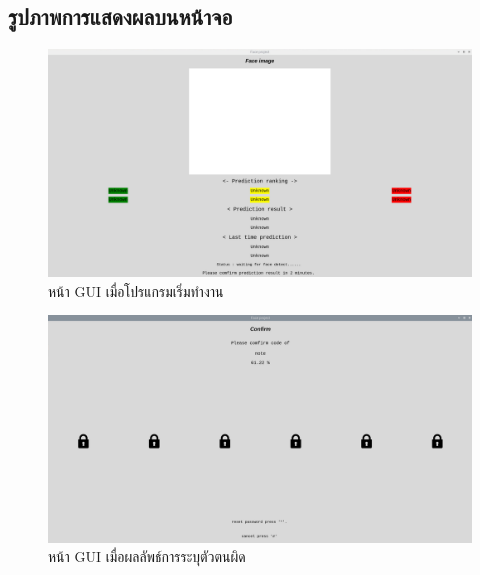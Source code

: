\newpage
\subsection{รูปภาพการแสดงผลบนหน้าจอ}

\begin{figure}[!ht]
    \begin{center}
      \includegraphics[scale=.25]{pic/main_page.png}
      \caption[หน้า GUI เมื่อโปรแกรมเริ่มทำงาน]{หน้า GUI เมื่อโปรแกรมเริ่มทำงาน}
      \label{fig:main_page}
    \end{center}
\end{figure}



\begin{figure}[!ht]
    \begin{center}
      \includegraphics[scale=.25]{pic/comfirm_page.png}
      \caption[หน้า GUI เมื่อผลลัพธ์การระบุตัวตนผิด]{หน้า GUI เมื่อผลลัพธ์การระบุตัวตนผิด}
      \label{fig:com_page}
    \end{center}
\end{figure}


